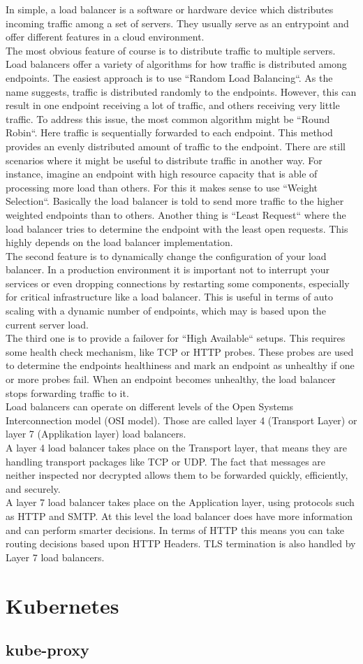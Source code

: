 In simple, a load balancer is a software or hardware device which distributes incoming traffic among a set of servers.
They usually serve as an entrypoint and offer different features in a cloud environment.
\\
The most obvious feature of course is to distribute traffic to multiple servers.
Load balancers offer a variety of algorithms for how traffic is distributed among endpoints.
The easiest approach is to use ``Random Load Balancing``.
As the name suggests, traffic is distributed randomly to the endpoints.
However, this can result in one endpoint receiving a lot of traffic, and others receiving very little traffic.
To address this issue, the most common algorithm might be ``Round Robin``.
Here traffic is sequentially forwarded to each endpoint.
This method provides an evenly distributed amount of traffic to the endpoint.
There are still scenarios where it might be useful to distribute traffic in another way.
For instance, imagine an endpoint with high resource capacity that is able of processing more load than others.
For this it makes sense to use ``Weight Selection``.
Basically the load balancer is told to send more traffic to the higher weighted endpoints than to others.
Another thing is ``Least Request`` where the load balancer tries to determine the endpoint with the least open requests.
This highly depends on the load balancer implementation.
\\
The second feature is to dynamically change the configuration of your load balancer.
In a production environment it is important not to interrupt your services or even dropping connections by restarting some components, especially for critical infrastructure like a load balancer.
This is useful in terms of auto scaling with a dynamic number of endpoints, which may is based upon the current server load.
\\
The third one is to provide a failover for ``High Available`` setups.
This requires some health check mechanism, like TCP or HTTP probes.
These probes are used to determine the endpoints healthiness and mark an endpoint as unhealthy if one or more probes fail.
When an endpoint becomes unhealthy, the load balancer stops forwarding traffic to it.
\\
Load balancers can operate on different levels of the Open Systems Interconnection model (OSI model).
Those are called layer 4 (Transport Layer) or layer 7 (Applikation layer) load balancers.
\\
A layer 4 load balancer takes place on the Transport layer, that means they are handling transport packages like TCP or UDP.
The fact that messages are neither inspected nor decrypted allows them to be forwarded quickly, efficiently, and securely.
\\
A layer 7 load balancer takes place on the Application layer, using protocols such as HTTP and SMTP.
At this level the load balancer does have more information and can perform smarter decisions.
In terms of HTTP this means you can take routing decisions based upon HTTP Headers.
TLS termination is also handled by Layer 7 load balancers.

\section{Kubernetes}


\subsection{kube-proxy}



